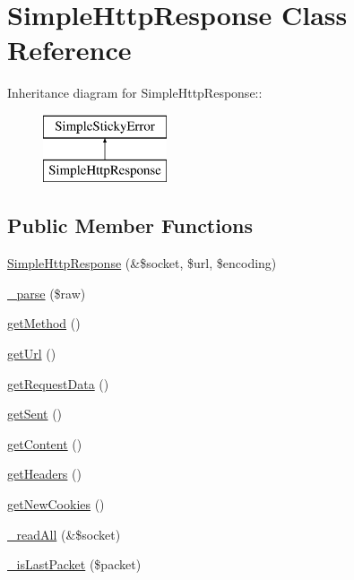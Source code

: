 \hypertarget{class_simple_http_response}{
\section{SimpleHttpResponse Class Reference}
\label{class_simple_http_response}
}
Inheritance diagram for SimpleHttpResponse::\begin{figure}[H]
\begin{center}
\leavevmode
\includegraphics[height=2cm]{class_simple_http_response}
\end{center}
\end{figure}
\subsection*{Public Member Functions}
\begin{DoxyCompactItemize}
\item 
\hyperlink{class_simple_http_response_a310e299fbb90b5943491ddf86bcd73dd}{SimpleHttpResponse} (\&\$socket, \$url, \$encoding)
\item 
\hyperlink{class_simple_http_response_a058da3bdd5e2f0589a9a8c807fe69fec}{\_\-parse} (\$raw)
\item 
\hyperlink{class_simple_http_response_ac3d79c4f31fae4ea243e1d08e6609ad8}{getMethod} ()
\item 
\hyperlink{class_simple_http_response_a2241dc18405a1f831af92943df1104ed}{getUrl} ()
\item 
\hyperlink{class_simple_http_response_a235dd94a72d35d5c61098fc9625baf72}{getRequestData} ()
\item 
\hyperlink{class_simple_http_response_a91e656519057e83140787b521cae9a56}{getSent} ()
\item 
\hyperlink{class_simple_http_response_a51520abd6975a68164b5575ce09d7e97}{getContent} ()
\item 
\hyperlink{class_simple_http_response_a64145c3fecb25cea2c6df4dd0b620ef0}{getHeaders} ()
\item 
\hyperlink{class_simple_http_response_a20d75659a803bc420d702951e0435a1d}{getNewCookies} ()
\item 
\hyperlink{class_simple_http_response_a91aa023b717df912b4dc6696107f76c4}{\_\-readAll} (\&\$socket)
\item 
\hyperlink{class_simple_http_response_abdc81c212568dd3fdeabef1856ba8579}{\_\-isLastPacket} (\$packet)
\end{DoxyCompactItemize}
